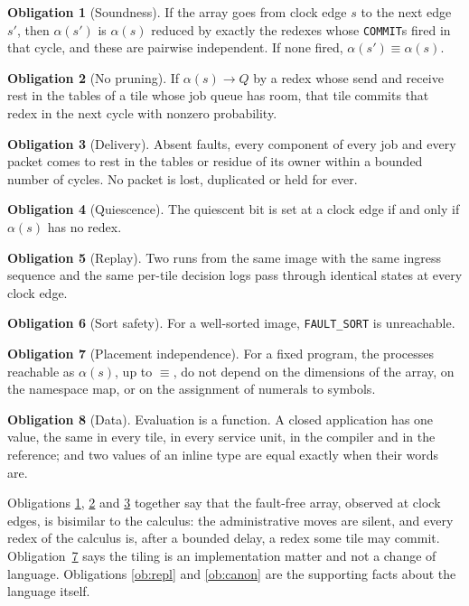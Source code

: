 \documentclass[11pt]{article}
\newcommand{\kw}[1]{\texttt{#1}}
\newcommand{\scong}{\equiv}
\newcommand{\red}{\rightarrow}
\theoremstyle{definition}
\newtheorem{obligation}{Obligation}
\theoremstyle{remark}
\begin{document}
\begin{obligation}[Soundness]\label{ob:sound}
If the array goes from clock edge $s$ to the next edge $s'$, then
$\alpha(s')$ is $\alpha(s)$ reduced by exactly the redexes whose \kw{COMMIT}s
fired in that cycle, and these are pairwise independent. If none fired,
$\alpha(s') \scong \alpha(s)$.
\end{obligation}
\begin{obligation}[No pruning]\label{ob:complete}
If $\alpha(s) \red Q$ by a redex whose send and receive rest in the tables of
a tile whose job queue has room, that tile commits that redex in the next
cycle with nonzero probability.
\end{obligation}
\begin{obligation}[Delivery]\label{ob:deliver}
Absent faults, every component of every job and every packet comes to rest in
the tables or residue of its owner within a bounded number of cycles. No
packet is lost, duplicated or held for ever.
\end{obligation}
\begin{obligation}[Quiescence]\label{ob:quiet}
The quiescent bit is set at a clock edge if and only if $\alpha(s)$ has no
redex.
\end{obligation}
\begin{obligation}[Replay]\label{ob:replay}
Two runs from the same image with the same ingress sequence and the same
per-tile decision logs pass through identical states at every clock edge.
\end{obligation}
\begin{obligation}[Sort safety]\label{ob:sort}
For a well-sorted image, \kw{FAULT\_SORT} is unreachable.
\end{obligation}
\begin{obligation}[Placement independence]\label{ob:place}
For a fixed program, the processes reachable as $\alpha(s)$, up to $\scong$,
do not depend on the dimensions of the array, on the namespace map, or on the
assignment of numerals to symbols.
\end{obligation}
\begin{obligation}[Data]\label{ob:data}
Evaluation is a function. A closed application has one value, the same in
every tile, in every service unit, in the compiler and in the reference; and
two values of an inline type are equal exactly when their words are.
\end{obligation}
Obligations \ref{ob:sound}, \ref{ob:complete} and \ref{ob:deliver} together
say that the fault-free array, observed at clock edges, is bisimilar to the
calculus: the administrative moves are silent, and every redex of the
calculus is, after a bounded delay, a redex some tile may commit.
Obligation~\ref{ob:place} says the tiling is an implementation matter and not
a change of language. Obligations \ref{ob:repl} and \ref{ob:canon} are the
supporting facts about the language itself.
\end{document}
